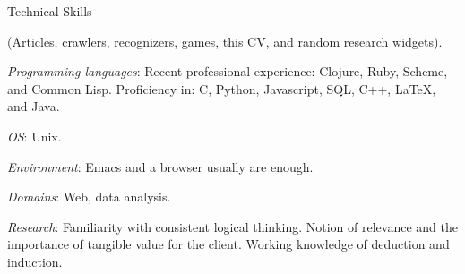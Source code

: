 \begin{rubric}{Technical Skills}{

  (Articles, crawlers, recognizers, games, this CV, and random research widgets).

  \entry* \emph{Programming languages}: Recent professional
  experience: Clojure, Ruby, Scheme, and Common Lisp. Proficiency in:
  C, Python, Javascript, SQL, C++, \LaTeX{}, and Java.

  \entry* \emph{OS}: Unix.

  \entry* \emph{Environment}: Emacs and a browser usually are enough.

  \entry* \emph{Domains}: Web, data analysis.

  \entry* \emph{Research}: Familiarity with consistent logical
  thinking. Notion of relevance and the importance of tangible value for the
  client. Working knowledge of deduction and induction.

}\end{rubric}
